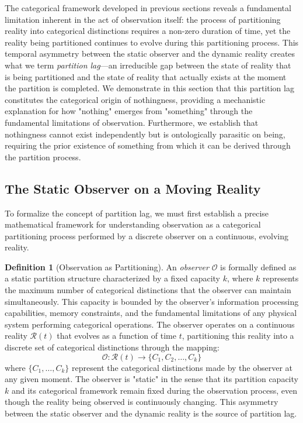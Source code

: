\documentclass[12pt,a4paper]{article}
\theoremstyle{definition}
\newtheorem{definition}[theorem]{Definition}
\theoremstyle{remark}
\begin{document}
The categorical framework developed in previous sections reveals a fundamental limitation inherent in the act of observation itself: the process of partitioning reality into categorical distinctions requires a non-zero duration of time, yet the reality being partitioned continues to evolve during this partitioning process. This temporal asymmetry between the static observer and the dynamic reality creates what we term \emph{partition lag}—an irreducible gap between the state of reality that is being partitioned and the state of reality that actually exists at the moment the partition is completed. We demonstrate in this section that this partition lag constitutes the categorical origin of nothingness, providing a mechanistic explanation for how "nothing" emerges from "something" through the fundamental limitations of observation. Furthermore, we establish that nothingness cannot exist independently but is ontologically parasitic on being, requiring the prior existence of something from which it can be derived through the partition process.

\subsection{The Static Observer on a Moving Reality}

To formalize the concept of partition lag, we must first establish a precise mathematical framework for understanding observation as a categorical partitioning process performed by a discrete observer on a continuous, evolving reality.

\begin{definition}[Observation as Partitioning]
\label{def:observation_partition}
An \emph{observer} $\mathcal{O}$ is formally defined as a static partition structure characterized by a fixed capacity $k$, where $k$ represents the maximum number of categorical distinctions that the observer can maintain simultaneously. This capacity is bounded by the observer's information processing capabilities, memory constraints, and the fundamental limitations of any physical system performing categorical operations. The observer operates on a continuous reality $\mathcal{R}(t)$ that evolves as a function of time $t$, partitioning this reality into a discrete set of categorical distinctions through the mapping:
\begin{equation}
    \mathcal{O}: \mathcal{R}(t) \to \{C_1, C_2, \ldots, C_k\}
\end{equation}
where $\{C_1, \ldots, C_k\}$ represent the categorical distinctions made by the observer at any given moment. The observer is "static" in the sense that its partition capacity $k$ and its categorical framework remain fixed during the observation process, even though the reality being observed is continuously changing. This asymmetry between the static observer and the dynamic reality is the source of partition lag.
\end{definition}
\end{document}
